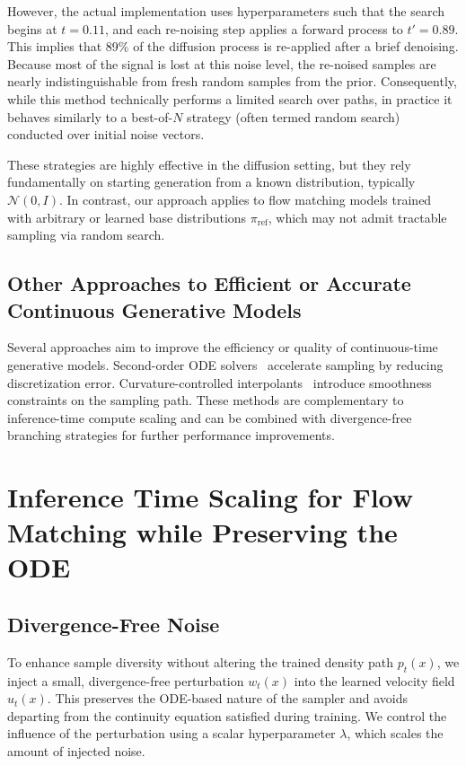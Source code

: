 \documentclass{article}
\begin{document}
However, the actual implementation uses hyperparameters such that the search begins at \( t = 0.11 \), and each re-noising step applies a forward process to \( t' = 0.89 \). This implies that 89\% of the diffusion process is re-applied after a brief denoising. Because most of the signal is lost at this noise level, the re-noised samples are nearly indistinguishable from fresh random samples from the prior. Consequently, while this method technically performs a limited search over paths, in practice it behaves similarly to a best-of-\( N \) strategy (often termed random search) conducted over initial noise vectors.

These strategies are highly effective in the diffusion setting, but they rely fundamentally on starting generation from a known distribution, typically \( \mathcal{N}(0, I) \). In contrast, our approach applies to flow matching models trained with arbitrary or learned base distributions \( \pi_{\mathrm{ref}} \), which may not admit tractable sampling via random search.

\subsection{Other Approaches to Efficient or Accurate Continuous Generative Models}

Several approaches aim to improve the efficiency or quality of continuous-time generative models. Second-order ODE solvers~\cite{zhang2023secondorder} accelerate sampling by reducing discretization error. Curvature-controlled interpolants~\cite{dockhorn2023stochastic} introduce smoothness constraints on the sampling path. These methods are complementary to inference-time compute scaling and can be combined with divergence-free branching strategies for further performance improvements.

\section{Inference Time Scaling for Flow Matching while Preserving the ODE}
\subsection{Divergence-Free Noise}

To enhance sample diversity without altering the trained density path \(p_t(x)\), we inject a small, divergence-free perturbation \(w_t(x)\) into the learned velocity field \(u_t(x)\). This preserves the ODE-based nature of the sampler and avoids departing from the continuity equation satisfied during training. We control the influence of the perturbation using a scalar hyperparameter \(\lambda\), which scales the amount of injected noise.
\end{document}
